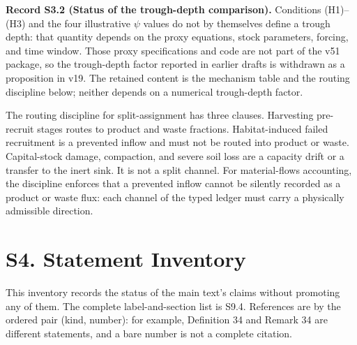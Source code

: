 \documentclass[11pt]{article}
\begin{document}
\textbf{Record S3.2 (Status of the trough-depth comparison).} Conditions (H1)--(H3) and the four illustrative \(\psi\) values do not by themselves define a trough depth: that quantity depends on the proxy equations, stock parameters, forcing, and time window. Those proxy specifications and code are not part of the v51 package, so the trough-depth factor reported in earlier drafts is withdrawn as a proposition in v19. The retained content is the mechanism table and the routing discipline below; neither depends on a numerical trough-depth factor.

The routing discipline for split-assignment has three clauses. Harvesting pre-recruit stages routes to product and waste fractions. Habitat-induced failed recruitment is a prevented inflow and must not be routed into product or waste. Capital-stock damage, compaction, and severe soil loss are a capacity drift or a transfer to the inert sink. It is not a split channel. For material-flows accounting, the discipline enforces that a prevented inflow cannot be silently recorded as a product or waste flux: each channel of the typed ledger must carry a physically admissible direction.

\vspace{0.8em}

\section*{S4. Statement Inventory}\label{s4-statement-inventory}

This inventory records the status of the main text's claims without promoting any of them. The complete label-and-section list is S9.4. References are by the ordered pair (kind, number): for example, Definition 34 and Remark 34 are different statements, and a bare number is not a complete citation.
\end{document}
